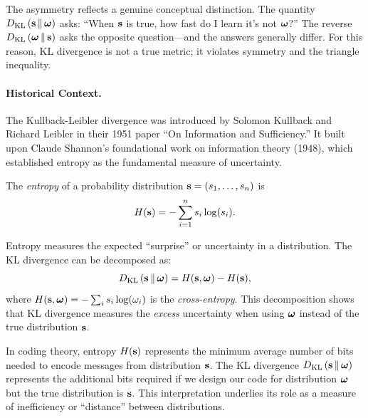 The asymmetry reflects a genuine conceptual distinction. The quantity $D_{\mathrm{KL}}\left(\mathbf{s} \,\|\, \boldsymbol{\omega}\right)$ asks: ``When $\mathbf{s}$ is true, how fast do I learn it's not $\boldsymbol{\omega}$?'' The reverse $D_{\mathrm{KL}}\left(\boldsymbol{\omega} \,\|\, \mathbf{s}\right)$ asks the opposite question---and the answers generally differ. For this reason, KL divergence is not a true metric; it violates symmetry and the triangle inequality.

\paragraph{Historical Context.}

The Kullback-Leibler divergence was introduced by Solomon Kullback and Richard Leibler in their 1951 paper ``On Information and Sufficiency.'' It built upon Claude Shannon's foundational work on information theory (1948), which established entropy as the fundamental measure of uncertainty.

\begin{definition}
\label{def:entropy}
The \emph{entropy} of a probability distribution $\mathbf{s} = (s_1, \ldots, s_n)$ is
\begin{equation}
H(\mathbf{s}) = -\sum_{i=1}^n s_i \log(s_i).
\end{equation}
\end{definition}

Entropy measures the expected ``surprise'' or uncertainty in a distribution. The KL divergence can be decomposed as:
\begin{equation}
\label{eq:kl-entropy-decomposition}
D_{\mathrm{KL}}\left(\mathbf{s} \,\|\, \boldsymbol{\omega}\right) = H(\mathbf{s}, \boldsymbol{\omega}) - H(\mathbf{s}),
\end{equation}
where $H(\mathbf{s}, \boldsymbol{\omega}) = -\sum_i s_i \log(\omega_i)$ is the \emph{cross-entropy}. This decomposition shows that KL divergence measures the \emph{excess} uncertainty when using $\boldsymbol{\omega}$ instead of the true distribution $\mathbf{s}$.

\begin{calloutnote}
In coding theory, entropy $H(\mathbf{s})$ represents the minimum average number of bits needed to encode messages from distribution $\mathbf{s}$. The KL divergence $D_{\mathrm{KL}}\left(\mathbf{s} \,\|\, \boldsymbol{\omega}\right)$ represents the additional bits required if we design our code for distribution $\boldsymbol{\omega}$ but the true distribution is $\mathbf{s}$. This interpretation underlies its role as a measure of inefficiency or ``distance'' between distributions.
\end{calloutnote}

